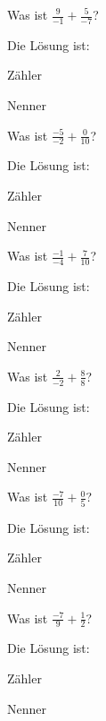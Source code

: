 \documentclass{ximera}
\begin{document}
\begin{shuffle}
\begin{question}
Was ist $\frac{9}{-1} + \frac{5}{-7}$?
\begin{solution}
Die Lösung ist:

Zähler 

Nenner 
\end{solution}
\end{question}


\begin{question}
Was ist $\frac{-5}{-2} + \frac{0}{10}$?
\begin{solution}
Die Lösung ist:

Zähler 

Nenner 
\end{solution}
\end{question}


\begin{question}
Was ist $\frac{-1}{-4} + \frac{7}{10}$?
\begin{solution}
Die Lösung ist:

Zähler 

Nenner 
\end{solution}
\end{question}


\begin{question}
Was ist $\frac{2}{-2} + \frac{8}{8}$?
\begin{solution}
Die Lösung ist:

Zähler 

Nenner 
\end{solution}
\end{question}


\begin{question}
Was ist $\frac{-7}{10} + \frac{0}{5}$?
\begin{solution}
Die Lösung ist:

Zähler 

Nenner 
\end{solution}
\end{question}


\begin{question}
Was ist $\frac{-7}{9} + \frac{1}{2}$?
\begin{solution}
Die Lösung ist:

Zähler 

Nenner 
\end{solution}
\end{question}



\end{shuffle}
\end{document}
